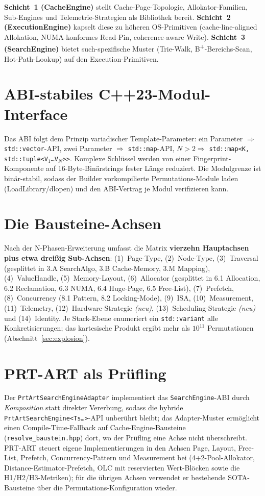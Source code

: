\textbf{Schicht~1 (CacheEngine)} stellt Cache-Page-Topologie, Allokator-Familien,
Sub-Engines und Telemetrie-Strategien als Bibliothek bereit. \textbf{Schicht~2
(ExecutionEngine)} kapselt diese zu höheren OS-Primitiven (cache-line-aligned Allokation,
NUMA-konformes Read-Pin, coherence-aware Write). \textbf{Schicht~3 (SearchEngine)} bietet
such-spezifische Muster (Trie-Walk, B\textsuperscript{+}-Bereichs-Scan, Hot-Path-Lookup) auf
den Execution-Primitiven.

\section{ABI-stabiles C++23-Modul-Interface}\label{sec:abi}

Das ABI folgt dem Prinzip variadischer Template-Parameter: ein Parameter $\Rightarrow$
\texttt{std::vector}-API, zwei Parameter $\Rightarrow$ \texttt{std::map}-API, $N>2 \Rightarrow$
\texttt{std::map<K,\,std::tuple<V$_1$\ldots V$_N$>>}. Komplexe Schlüssel werden von einer
Fingerprint-Komponente auf 16-Byte-Binärstrings fester Länge reduziert. Die Modulgrenze ist
binär-stabil, sodass der Builder vorkompilierte Permutations-Module laden
(LoadLibrary/dlopen) und den ABI-Vertrag je Modul verifizieren kann.

\section{Die Bausteine-Achsen}\label{sec:axes}

Nach der N-Phasen-Erweiterung umfasst die Matrix \textbf{vierzehn Hauptachsen plus etwa
dreißig Sub-Achsen}: (1)~Page-Type, (2)~Node-Type, (3)~Traversal (gesplittet in 3.A
SearchAlgo, 3.B Cache-Memory, 3.M Mapping), (4)~ValueHandle, (5)~Memory-Layout, (6)~Allocator
(gesplittet in 6.1 Allocation, 6.2 Reclamation, 6.3 NUMA, 6.4 Huge-Page, 6.5 Free-List),
(7)~Prefetch, (8)~Concurrency (8.1 Pattern, 8.2 Locking-Mode), (9)~ISA, (10)~Measurement,
(11)~Telemetry, (12)~Hardware-Strategie \emph{(neu)}, (13)~Scheduling-Strategie \emph{(neu)}
und (14)~Identity. Je Stack-Ebene enumeriert ein \texttt{std::variant} alle
Konkretisierungen; das kartesische Produkt ergibt mehr als $10^{11}$ Permutationen
(Abschnitt~\ref{sec:explosion}).

\section{PRT-ART als Prüfling}\label{sec:prt-art}

Der \texttt{PrtArtSearchEngineAdapter} implementiert das \texttt{SearchEngine}-ABI durch
\emph{Komposition} statt direkter Vererbung, sodass die hybride
\texttt{PrtArtSearchEngine<Ts\ldots>}-API unberührt bleibt; das Adapter-Muster ermöglicht
einen Compile-Time-Fallback auf Cache-Engine-Bausteine (\texttt{resolve\_baustein.hpp}) dort,
wo der Prüfling eine Achse nicht überschreibt. PRT-ART steuert eigene Implementierungen in den
Achsen Page, Layout, Free-List, Prefetch, Concurrency-Pattern und Measurement bei
(4+2-Pool-Allokator, Distance-Estimator-Prefetch, OLC mit reservierten Wert-Blöcken sowie die
H1/H2/H3-Metriken); für die übrigen Achsen verwendet er bestehende SOTA-Bausteine über die
Permutations-Konfiguration wieder.

